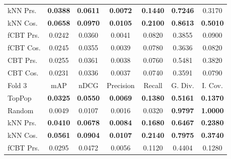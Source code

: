 \begin{table}[hbt]
\begin{tabulary}{\textwidth}{|L|CCCCCC|}
kNN Prs. & \textbf{0.0388} &  \textbf{0.0611} &  \textbf{0.0072} &  \textbf{0.1440} &                                  \textbf{0.7246} &                                            0.3170 \\
kNN Cos. & \textbf{0.0658} &  \textbf{0.0970} &  \textbf{0.0105} &  \textbf{0.2100} &                                  \textbf{0.8613} &                                   \textbf{0.5010} \\
fCBT Prs. & 0.0242 &           0.0360 &           0.0041 &           0.0820 &                                           0.3855 &                                            0.0900 \\
fCBT Cos. & 0.0245 &           0.0355 &           0.0039 &           0.0780 &                                           0.3636 &                                            0.0820 \\
CBT Prs. & 0.0255 &           0.0361 &           0.0038 &           0.0760 &                                           0.5481 &                                            0.3820 \\
CBT Cos. & 0.0231 &           0.0336 &           0.0037 &           0.0740 &                                           0.3591 &                                            0.0790 \\
\hline
\hline
Fold 3 & mAP & nDCG & Precision & Recall & G. Div. & I. Cov. \\
\hline
TopPop & \textbf{0.0325} &  \textbf{0.0550} &  \textbf{0.0069} &  \textbf{0.1380} &                                  \textbf{0.5161} &                                   \textbf{0.1370} \\
Random & 0.0049 &           0.0107 &           0.0016 &           0.0320 &                                  \textbf{0.9797} &                                   \textbf{1.0000} \\
kNN Prs. & \textbf{0.0410} &  \textbf{0.0678} &  \textbf{0.0084} &  \textbf{0.1680} &                                  \textbf{0.6467} &                                   \textbf{0.2380} \\
kNN Cos. & \textbf{0.0561} &  \textbf{0.0904} &  \textbf{0.0107} &  \textbf{0.2140} &                                  \textbf{0.7975} &                                   \textbf{0.3740} \\
fCBT Prs. & 0.0295 &           0.0472 &           0.0056 &           0.1120 &                                           0.4404 &                                            0.1280 \\

\end{tabulary}
\end{table}

